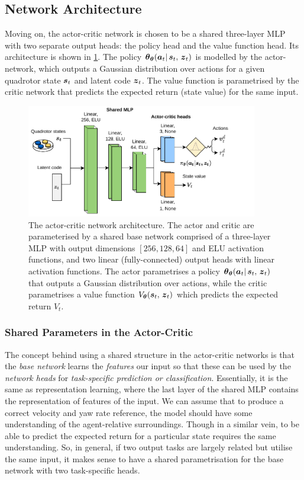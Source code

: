 \subsection{Network Architecture}
\label{subsec:5_MLP_architecture}
Moving on, the actor-critic network is chosen to be a shared three-layer MLP with two separate output heads: the policy head and the value function head. Its architecture is shown in \cref{fig:5_actor_critic}. The policy $\boldsymbol{\theta}_{\boldsymbol{\theta}}({\boldsymbol{a}}_t |\, {\boldsymbol{s}}_t, \, {\boldsymbol{z}}_t)$ is modelled by the actor-network, which outputs a Gaussian distribution over actions for a given quadrotor state ${\boldsymbol{s}}_t$ and latent code ${\boldsymbol{z}}_t$. The value function is parametrised by the critic network that predicts the expected return (state value) for the same input.
\begin{figure}[hbt]
    \centering
    \includegraphics[width=0.9\textwidth]{figures/5_/5_actor_critic.pdf}
    \caption{The actor-critic network architecture. The actor and critic are parameterised by a shared base network comprised of a three-layer MLP with output dimensions $[256, 128, 64]$ and ELU activation functions, and two linear (fully-connected) output heads with linear activation functions. The actor parametrises a policy $\boldsymbol{\theta}_{\boldsymbol{\theta}}({\boldsymbol{a}}_t |\, {\boldsymbol{s}}_t, \, {\boldsymbol{z}}_t)$ that outputs a Gaussian distribution over actions, while the critic parametrises a value function $V_{\boldsymbol{\theta}} ({\boldsymbol{s}}_t, \, {\boldsymbol{z}}_t)$ which predicts the expected return $V_t$.}
    \label{fig:5_actor_critic}
\end{figure}

\subsubsection{Shared Parameters in the Actor-Critic}
The concept behind using a shared structure in the actor-critic networks is that the \textit{base network} learns the \textit{features} our input so that these can be used by the \textit{network heads} for \textit{task-specific prediction or classification}. Essentially, it is the same as representation learning, where the last layer of the shared MLP contains the representation of features of the input. 
We can assume that to produce a correct velocity and yaw rate reference, the model should have some understanding of the agent-relative surroundings. Though in a similar vein, to be able to predict the expected return for a particular state requires the same understanding. So, in general, if two output tasks are largely related but utilise the same input, it makes sense to have a shared parametrisation for the base network with two task-specific heads.

